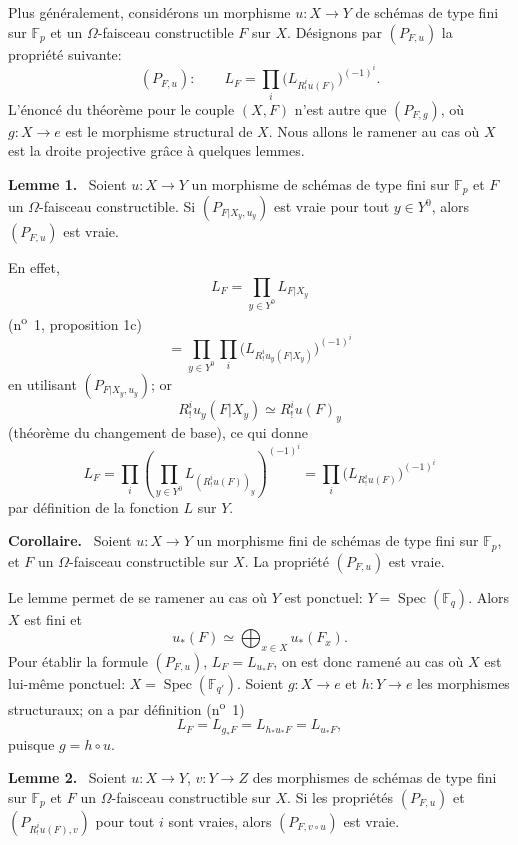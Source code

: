 \documentclass[11pt]{article}
\newenvironment{statement}[1]{\par\medskip\noindent\textbf{#1.}\ }{\par\medskip}
\DeclareMathOperator{\Spec}{Spec}
\providecommand{\Spec}{\operatorname{Spec}}
\providecommand{\Spec}{\operatorname{Spec}}
\providecommand{\Spec}{\operatorname{Spec}}
\providecommand{\Spec}{\operatorname{Spec}}
\begin{document}
Plus généralement, considérons un morphisme $u:X\to Y$ de schémas de type fini sur $\mathbb F_p$ et un $\Omega$-faisceau constructible $F$ sur $X$. Désignons par $(P_{F,u})$ la propriété suivante:
\[
(P_{F,u}):\qquad
L_F=\prod_i\bigl(L_{R^i_!u(F)}\bigr)^{(-1)^i}.
\]
L'énoncé du théorème pour le couple $(X,F)$ n'est autre que $(P_{F,g})$, où $g:X\to e$ est le morphisme structural de $X$. Nous allons le ramener au cas où $X$ est la droite projective grâce à quelques lemmes.

\begin{statement}{Lemme 1}
Soient $u:X\to Y$ un morphisme de schémas de type fini sur $\mathbb F_p$ et $F$ un $\Omega$-faisceau constructible. Si $(P_{F|X_y,u_y})$ est vraie pour tout $y\in Y^0$, alors $(P_{F,u})$ est vraie.
\end{statement}

En effet,
\[
L_F=\prod_{y\in Y^0}L_{F|X_y}
\]
(n\textsuperscript{o}~1, proposition 1c)
\[
=\prod_{y\in Y^0}\prod_i\bigl(L_{R^i_!u_y(F|X_y)}\bigr)^{(-1)^i}
\]
en utilisant $(P_{F|X_y,u_y})$; or
\[
R^i_!u_y(F|X_y)\simeq R^i_!u(F)_y
\]
(théorème du changement de base), ce qui donne
\[
L_F=\prod_i\left(\prod_{y\in Y^0}L_{(R^i_!u(F))_y}\right)^{(-1)^i}
=\prod_i\bigl(L_{R^i_!u(F)}\bigr)^{(-1)^i}
\]
par définition de la fonction $L$ sur $Y$.

\begin{statement}{Corollaire}
Soient $u:X\to Y$ un morphisme fini de schémas de type fini sur $\mathbb F_p$, et $F$ un $\Omega$-faisceau constructible sur $X$. La propriété $(P_{F,u})$ est vraie.
\end{statement}

Le lemme permet de se ramener au cas où $Y$ est ponctuel: $Y=\Spec(\mathbb F_q)$. Alors $X$ est fini et
\[
u_*(F)\simeq \bigoplus_{x\in X}u_*(F_x).
\]
Pour établir la formule $(P_{F,u})$, $L_F=L_{u_*F}$, on est donc ramené au cas où $X$ est lui-même ponctuel: $X=\Spec(\mathbb F_{q'})$. Soient $g:X\to e$ et $h:Y\to e$ les morphismes structuraux; on a par définition (n\textsuperscript{o}~1)
\[
L_F=L_{g_*F}=L_{h_*u_*F}=L_{u_*F},
\]
puisque $g=h\circ u$.

\begin{statement}{Lemme 2}
Soient $u:X\to Y$, $v:Y\to Z$ des morphismes de schémas de type fini sur $\mathbb F_p$ et $F$ un $\Omega$-faisceau constructible sur $X$. Si les propriétés $(P_{F,u})$ et $(P_{R^i_!u(F),v})$ pour tout $i$ sont vraies, alors $(P_{F,v\circ u})$ est vraie.
\end{statement}
\end{document}
